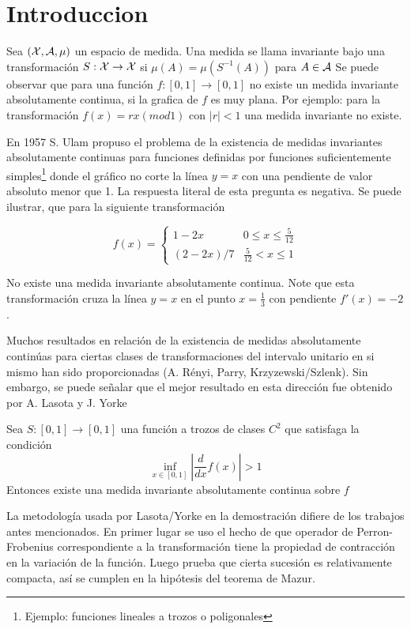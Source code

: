 \section{Introduccion}
Sea $(\mathcal{X}, \mathcal{A},\mu)$ un espacio de medida. Una medida se llama invariante bajo una transformaci\'on $S:\mathcal{X}\rightarrow\mathcal{X}$ si
$\mu(A)=\mu(S^{-1}(A))$ para $A\in\mathcal{A}$
Se puede observar que para una funci\'on $f:[0,1]\rightarrow[0,1]$ no existe un medida invariante absolutamente
continua, si la grafica de $f$ es muy plana. Por ejemplo: para la transformaci\'on $f(x)=rx (mod 1) $ con $|r|<1$ una medida invariante no existe.

En 1957 S. Ulam propuso el problema de la existencia de medidas invariantes absolutamente continuas
para funciones definidas por funciones suficientemente simples\footnote{Ejemplo: funciones lineales a trozos o poligonales}
donde el gr\'afico no corte la l\'inea $y=x$ con una pendiente de valor absoluto menor que 1. La respuesta  literal de
esta pregunta es negativa. Se puede ilustrar, que para la siguiente transformaci\'on

$$f(x)=\begin{cases}
		 1-2x     & 0\leq x\leq\frac{5}{12}\\	
         (2-2x)/7 & \frac{5}{12}< x\leq 1
        \end{cases}$$

No existe una medida invariante absolutamente continua. Note que esta transformaci\'on cruza la
l\'inea $y=x$ en el punto $x=\frac{1}{3}$ con pendiente $f'(x)=-2$.

Muchos resultados en relaci\'on de la existencia de medidas absolutamente contin\'uas para ciertas clases de
transformaciones del  intervalo unitario en si mismo han sido proporcionadas (A. R\'enyi, Parry, Krzyzewski/Szlenk).
Sin embargo, se puede se\~nalar que el mejor resultado en esta direcci\'on fue obtenido por A. Lasota y J. Yorke

\begin{teo} Sea $S:[0,1]\rightarrow[0,1]$ una funci\'on a trozos de clases $C^2$ que satisfaga la condici\'on
$$\inf_{x\in[0,1]}|\frac{d}{dx}f(x)|>1$$
Entonces existe una medida invariante absolutamente continua sobre $f$
\end{teo}

La metodolog\'ia usada por Lasota/Yorke en la demostraci\'on difiere  de los trabajos antes mencionados. En primer lugar se
uso el hecho de que operador de  Perron-Frobenius correspondiente a la transformaci\'on  tiene la propiedad de contracci\'on
en la variaci\'on de la funci\'on.  Luego prueba que cierta sucesi\'on es relativamente compacta, as\'i se cumplen en la
hip\'otesis del teorema de Mazur.

